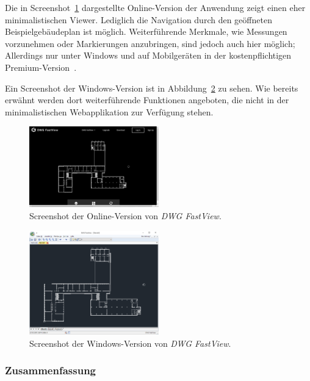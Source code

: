 Die in Screenshot~\ref{fig:dwg-fastview-online} dargestellte Online-Version der Anwendung zeigt einen eher minimalistischen Viewer.
Lediglich die Navigation durch den geöffneten Beispielgebäudeplan ist möglich.
Weiterführende Merkmale, wie Messungen vorzunehmen oder Markierungen anzubringen, sind jedoch auch hier möglich; Allerdings nur unter Windows und auf Mobilgeräten in der kostenpflichtigen Premium-Version~\cite{DWGFastViewPremium}.

Ein Screenshot der Windows-Version ist in Abbildung~\ref{fig:dwg-fastview-windows} zu sehen.
Wie bereits erwähnt werden dort weiterführende Funktionen angeboten, die nicht in der minimalistischen Webapplikation zur Verfügung stehen.

\begin{figure}
    \includegraphics[width=0.5\textwidth]{res/dwg-fastview-online.png}
    \caption{Screenshot der Online-Version von \textit{DWG FastView}.}
    \label{fig:dwg-fastview-online}
\end{figure}

\begin{figure}
    \includegraphics[width=0.5\textwidth]{res/dwg-fastview.png}
    \caption{Screenshot der Windows-Version von \textit{DWG FastView}.}
    \label{fig:dwg-fastview-windows}
\end{figure}

\subsubsection{Zusammenfassung}
\label{subsubsec:cad-viewer-comparison-summary}

